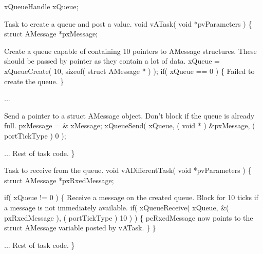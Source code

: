 \begin{DoxyPre} xQueueHandle xQueue;\end{DoxyPre}



\begin{DoxyPre}Task to create a queue and post a value.
 void vATask( void *pvParameters )
 \{
 struct AMessage *pxMessage;\end{DoxyPre}



\begin{DoxyPre}Create a queue capable of containing 10 pointers to AMessage structures.
These should be passed by pointer as they contain a lot of data.
    xQueue = xQueueCreate( 10, sizeof( struct AMessage * ) );
    if( xQueue == 0 )
    \{
Failed to create the queue.
    \}\end{DoxyPre}



\begin{DoxyPre}...\end{DoxyPre}



\begin{DoxyPre}Send a pointer to a struct AMessage object.  Don't block if the
queue is already full.
    pxMessage = \& xMessage;
    xQueueSend( xQueue, ( void * ) \&pxMessage, ( portTickType ) 0 );\end{DoxyPre}



\begin{DoxyPre}... Rest of task code.
 \}\end{DoxyPre}



\begin{DoxyPre}Task to receive from the queue.
 void vADifferentTask( void *pvParameters )
 \{
 struct AMessage *pxRxedMessage;\end{DoxyPre}



\begin{DoxyPre}    if( xQueue != 0 )
    \{
Receive a message on the created queue.  Block for 10 ticks if a
message is not immediately available.
        if( xQueueReceive( xQueue, \&( pxRxedMessage ), ( portTickType ) 10 ) )
        \{
pcRxedMessage now points to the struct AMessage variable posted
by vATask.
        \}
    \}\end{DoxyPre}



\begin{DoxyPre}... Rest of task code.
 \}
 \end{DoxyPre}


